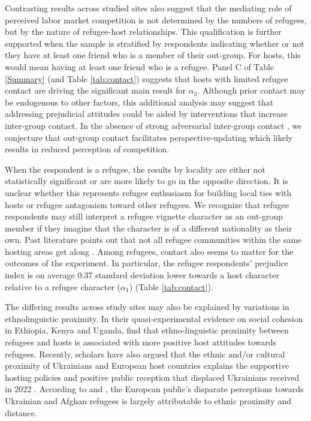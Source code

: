 \documentclass[a4paper,12pt]{article}
\begin{document}
Contrasting results across studied sites also suggest that the mediating role of perceived labor market competition is not determined by the numbers of refugees, but by the nature of refugee-host relationships. This qualification is further supported when the sample is stratified by respondents indicating whether or not they have at least one friend who is a member of their out-group. For hosts, this would mean having at least one friend who is a refugee. Panel C of Table \ref{Summary} (and Table \ref{tab:contact}) suggests that hosts with limited refugee contact are driving the significant main result for $\alpha_{3}$. Although prior contact may be endogenous to other factors, this additional analysis may suggest that addressing prejudicial attitudes could be aided by interventions that increase inter-group contact. In the absence of strong adversarial inter-group contact \citep{lowe2021}, we conjecture that out-group contact facilitates perspective-updating which likely results in reduced perception of competition. 

When the respondent is a refugee, the results by locality are either not statistically significant or are more likely to go in the opposite direction. It is unclear whether this represents refugee enthusiasm for building local ties with hosts or refugee antagonism toward other refugees. We recognize that refugee respondents may still interpret a refugee vignette character as an out-group member if they imagine that the character is of a different nationality as their own. Past literature points out that not all refugee communities within the same hosting areas get along \citep{bjorkhaug2020revisiting}. Among refugees, contact also seems to matter for the outcomes of the experiment. In particular, the refugee respondents' prejudice index is on average $0.37$ standard deviation lower towards a host character relative to a refugee character ($\alpha_{1}$) (Table \ref{tab:contact}). 

The differing results across study sites may also be explained by variations in ethnolinguistic proximity. In their quasi-experimental evidence on social cohesion in Ethiopia, Kenya and Uganda, \citet{betts2023refugees} find that ethno-linguistic proximity between refugees and hosts is associated with more positive host attitudes towards refugees. Recently, scholars have also argued that the ethnic and/or cultural proximity of Ukrainians and European host countries explains the supportive hosting policies and positive public reception that displaced Ukrainians received in 2022 
 \citep{leonard2022europe, bosilj2022european}.  According to \citet{de2023refugee} and \citet{iordache2024perceptions}, the European public's disparate perceptions towards Ukrainian and Afghan refugees is largely attributable to ethnic proximity and distance.
\end{document}
